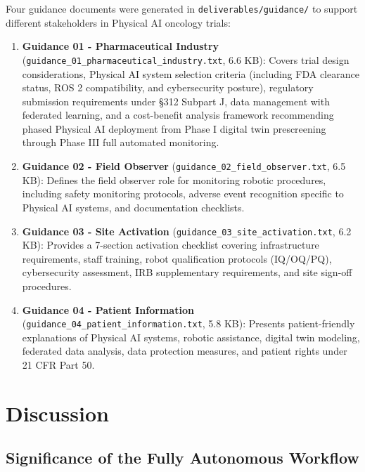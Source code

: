 \documentclass{article}
\begin{document}
Four guidance documents were generated in \texttt{deliverables/guidance/} to support different stakeholders in Physical AI oncology trials:

\begin{enumerate}[leftmargin=*]
\item \textbf{Guidance 01 - Pharmaceutical Industry} (\texttt{guidance\_01\_pharmaceutical\_industry.txt}, 6.6 KB): Covers trial design considerations, Physical AI system selection criteria (including FDA clearance status, ROS 2 compatibility, and cybersecurity posture), regulatory submission requirements under \S312 Subpart J, data management with federated learning, and a cost-benefit analysis framework recommending phased Physical AI deployment from Phase I digital twin prescreening through Phase III full automated monitoring.

\item \textbf{Guidance 02 - Field Observer} (\texttt{guidance\_02\_field\_observer.txt}, 6.5 KB): Defines the field observer role for monitoring robotic procedures, including safety monitoring protocols, adverse event recognition specific to Physical AI systems, and documentation checklists.

\item \textbf{Guidance 03 - Site Activation} (\texttt{guidance\_03\_site\_activation.txt}, 6.2 KB): Provides a 7-section activation checklist covering infrastructure requirements, staff training, robot qualification protocols (IQ/OQ/PQ), cybersecurity assessment, IRB supplementary requirements, and site sign-off procedures.

\item \textbf{Guidance 04 - Patient Information} (\texttt{guidance\_04\_patient\_information.txt}, 5.8 KB): Presents patient-friendly explanations of Physical AI systems, robotic assistance, digital twin modeling, federated data analysis, data protection measures, and patient rights under 21 CFR Part 50.
\end{enumerate}

\section{Discussion}
\label{sec:discussion}

\subsection{Significance of the Fully Autonomous Workflow}
\end{document}
